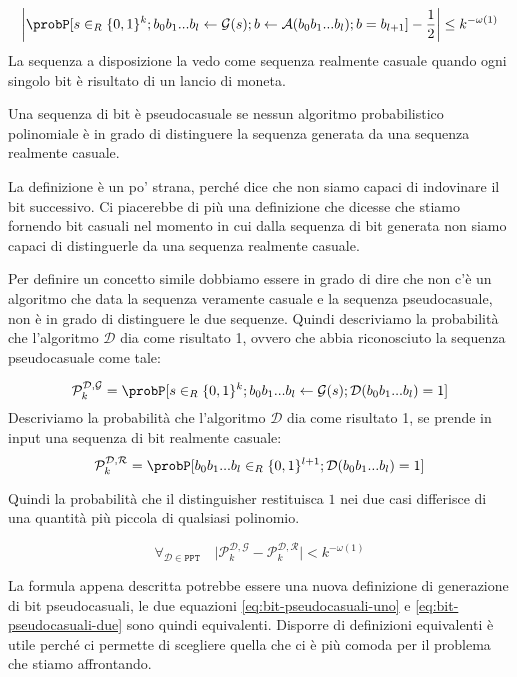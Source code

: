 \begin{equation}\label{eq:bit-pseudocasuali-uno}
  \bigg| \probP[s \in_R \{0,1\}^k; b_0 b_1 ... b_l \gets \mathcal{G}(s);
  b \gets \mathcal{A}(b_0 b_1 ... b_l); b = b_{l+1}] - \frac{1}{2} \bigg| \leq k^{-\omega(1)}
\end{equation}
La sequenza a disposizione la vedo come sequenza realmente casuale quando 
ogni singolo bit è risultato di un lancio di moneta. 

\begin{tcolorbox}
  Una sequenza di bit è pseudocasuale se nessun algoritmo probabilistico polinomiale
  è in grado di distinguere la sequenza generata da una sequenza realmente casuale.
\end{tcolorbox}

La definizione è un po' strana, perché dice che non siamo capaci di indovinare 
il bit successivo. Ci piacerebbe di più una definizione che dicesse che stiamo 
fornendo bit casuali nel momento in cui dalla sequenza di bit generata non siamo 
capaci di distinguerle da una sequenza realmente casuale.

Per definire un concetto simile dobbiamo essere in grado di dire che non c'è un algoritmo 
che data la sequenza veramente casuale e la sequenza pseudocasuale, non è in grado di
distinguere le due sequenze. Quindi descriviamo la probabilità che l'algoritmo $\mathcal{D}$ dia come risultato 1, 
ovvero che abbia riconosciuto la sequenza pseudocasuale come tale:

\[
  \mathcal{P}_k^{\mathcal{D},\mathcal{G}} = \probP[s \in_R \{0,1\}^k;
  b_0 b_1 ... b_l \gets \mathcal{G}(s); \mathcal{D}(b_0 b_1 ... b_l) = 1]
\]
Descriviamo la probabilità che l'algoritmo $\mathcal{D}$ dia come risultato 1, 
se prende in input una sequenza di bit realmente casuale:
\[
\mathcal{P}_k^{\mathcal{D},\mathcal{R}} = \probP[b_0 b_1 ... b_l \in_R \{0,1\}^{l+1}; \mathcal{D}(b_0 b_1 ... b_l) = 1]
\]
\begin{tcolorbox}
  Quindi la probabilità che il distinguisher restituisca $1$ nei due casi differisce di 
  una quantità più piccola di qualsiasi polinomio.
  
  \begin{equation}\label{eq:bit-pseudocasuali-due}
    \forall_{\mathcal{D} \in \texttt{PPT}} \quad \bigg| \mathcal{P}_k^{\mathcal{D},\mathcal{G}}
    - \mathcal{P}_k^{\mathcal{D},\mathcal{R}} \bigg| < k^{-\omega(1)}
  \end{equation}
\end{tcolorbox}
La formula appena descritta potrebbe essere una nuova definizione di generazione di bit pseudocasuali,
le due equazioni \ref{eq:bit-pseudocasuali-uno} e \ref{eq:bit-pseudocasuali-due} sono quindi equivalenti.
Disporre di definizioni equivalenti è utile perché ci permette di scegliere quella che ci è più comoda 
per il problema che stiamo affrontando.


